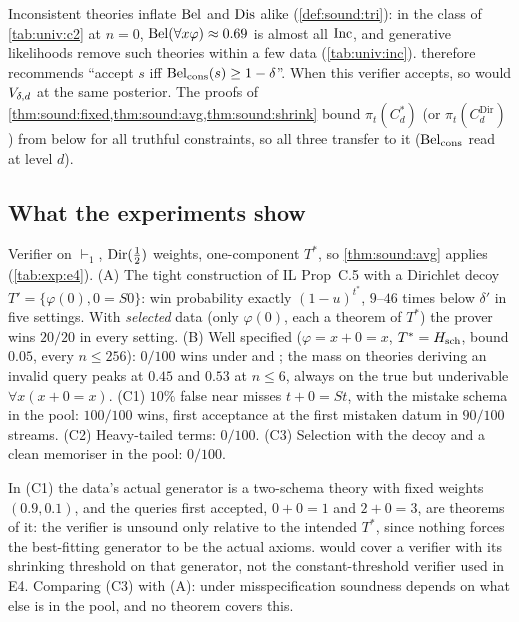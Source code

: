 \begin{remark}\label{rem:sound:belc}
Inconsistent theories inflate $\mathrm{Bel}$ and $\mathrm{Dis}$ alike (\cref{def:sound:tri}): in the class of \cref{tab:univ:c2} at $n=0$, $\mathrm{Bel}(\forall x\varphi)\approx0.69$ is almost all $\mathrm{Inc}$, and generative likelihoods remove such theories within a few data (\cref{tab:univ:inc}).  therefore recommends ``accept $s$ iff $\mathrm{Bel}_{\mathrm{cons}}(s)\ge1-\delta$''. When this verifier accepts, so would $V_{\delta,d}$ at the same posterior. The proofs of \cref{thm:sound:fixed,thm:sound:avg,thm:sound:shrink} bound $\pi_t(C^*_d)$ (or $\pi_t(C^{\mathrm{Dir}}_d)$) from below for all truthful constraints, so all three transfer to it ($\mathrm{Bel}_{\mathrm{cons}}$ read at level $d$).
\end{remark}

\subsection{What the experiments show}\label{sec:sound:exp}

\begin{remark}\label{rem:sound:e4}
Verifier on $\vdash_1$, $\mathrm{Dir}(\tfrac12)$ weights, one-component $T^*$, so \cref{thm:sound:avg} applies (\cref{tab:exp:e4}). (A) The tight construction of IL Prop~C.5 with a Dirichlet decoy $T'=\{\varphi(0),0=S0\}$: win probability exactly $(1-u)^{t^*}$, $9$--$46$ times below $\delta'$ in five settings. With \emph{selected} data (only $\varphi(0)$, each a theorem of $T^*$) the prover wins $20/20$ in every setting. (B) Well specified ($\varphi=x+0=x$, $T^*=H_{\mathrm{sch}}$, bound $0.05$, every $n\le256$): $0/100$ wins under \Lzero{} and \Lone; the mass on theories deriving an invalid query peaks at $0.45$ and $0.53$ at $n\le6$, always on the true but underivable $\forall x(x+0=x)$. (C1) $10\%$ false near misses $t+0=St$, with the mistake schema in the pool: $100/100$ wins, first acceptance at the first mistaken datum in $90/100$ streams. (C2) Heavy-tailed terms: $0/100$. (C3) Selection with the decoy and a clean memoriser in the pool: $0/100$.
\end{remark}

In (C1) the data's actual generator is a two-schema theory with fixed weights $(0.9,0.1)$, and the queries first accepted, $0+0=1$ and $2+0=3$, are theorems of it: the verifier is unsound only relative to the intended $T^*$, since nothing forces the best-fitting generator to be the actual axioms.  would cover a verifier with its shrinking threshold on that generator, not the constant-threshold verifier used in E4. Comparing (C3) with (A): under misspecification soundness depends on what else is in the pool, and no theorem covers this.

